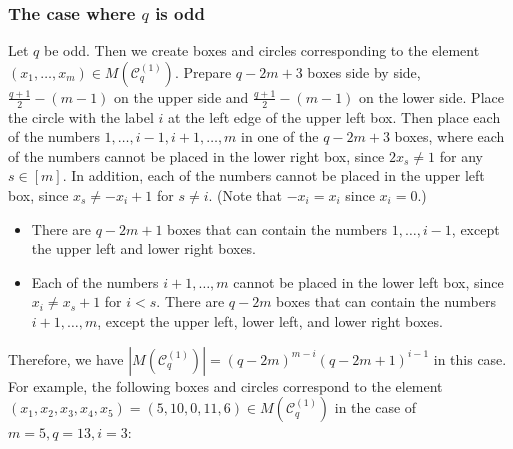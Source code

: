 \documentclass{article}
\theoremstyle{plain}
\theoremstyle{definition}
\theoremstyle{remark}
\numberwithin{equation}{section}
\newcommand{\Cc}{\mathcal{C}}
\begin{document}
\subsubsection{The case where $q$ is odd}\label{sec-TypeC-rest-2x_i=0-odd}
Let $q$ be odd.
Then we create boxes and circles corresponding to the element $(x_1,\dots,x_m)\in M(\Cc^{(1)}_q)$.
Prepare $q-2m+3$ boxes side by side, $\displaystyle \frac{q+1}{2}-(m-1)$ on the upper side and $\displaystyle \frac{q+1}{2}-(m-1)$ on the lower side.
Place the circle with the label $i$ at the left edge of the upper left box.
Then place each of the numbers $1,\dots,i-1,i+1,\dots,m$ in one of the $q-2m+3$ boxes, where each of the numbers cannot be placed in the lower right box, since $2x_s\neq 1$ for any $s\in [m]$.
In addition, each of the numbers cannot be placed in the upper left box, since $x_s\neq -x_i+1$ for $s\neq i$. 
(Note that $-x_i=x_i$ since $x_i=0$.) 
\begin{itemize}
\item There are $q-2m+1$ boxes that can contain the numbers $1,\dots,i-1$, except the upper left and lower right boxes.

\item Each of the numbers $i+1,\dots,m$ cannot be placed in the lower left box, since $x_i\neq x_s+1$ for $i<s$.
There are $q-2m$ boxes that can contain the numbers $i+1,\dots,m$, except the upper left, lower left, and lower right boxes.
\end{itemize}
Therefore, we have $|M(\Cc^{(1)}_q)|=(q-2m)^{m-i}(q-2m+1)^{i-1}$ in this case.
For example, the following boxes and circles correspond to the element $(x_1,x_2,x_3,x_4,x_5)=(5,10,0,11,6)\in M(\Cc^{(1)}_q)$ in the case of $m=5,q=13,i=3$:
\begin{center}
\end{center}
\end{document}
